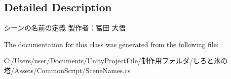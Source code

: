 \subsection{Detailed Description}
シーンの名前の定義 製作者：冨田 大悟 



The documentation for this class was generated from the following file\+:\begin{DoxyCompactItemize}
\item 
C\+:/\+Users/user/\+Documents/\+Unity\+Project\+File/制作用フォルダ/しろと氷の塔/\+Assets/\+Common\+Script/Scene\+Names.\+cs\end{DoxyCompactItemize}
